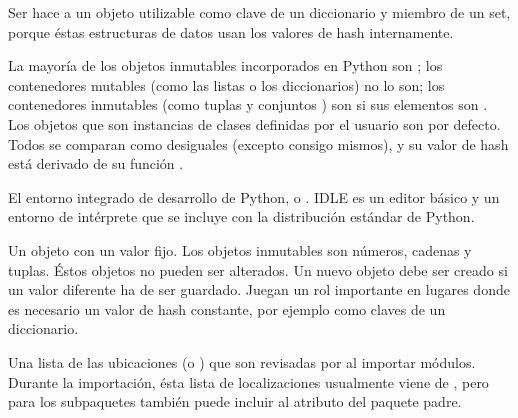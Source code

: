 \documentclass[a4,10pt,spanish]{sphinxmanual}
\begin{document}
\begin{description}
\sphinxAtStartPar
Ser  hace a un objeto utilizable como clave de un diccionario y miembro de un set, porque éstas estructuras de datos usan los valores de hash internamente.

\sphinxAtStartPar
La mayoría de los objetos inmutables incorporados en Python son ; los contenedores mutables (como las listas o los diccionarios) no lo son; los contenedores inmutables (como tuplas y conjuntos ) son  si sus elementos son  .  Los objetos que son instancias de clases definidas por el usuario son  por defecto.  Todos se comparan como desiguales (excepto consigo mismos), y su valor de hash está derivado de su función .

\item[{IDLE\index{IDLE@\spxentry{IDLE}|spxpagem}\phantomsection\label{\detokenize{glossary:term-IDLE}}}] \leavevmode
\sphinxAtStartPar
El entorno integrado de desarrollo de Python, o .  IDLE es un editor básico y un entorno de intérprete que se incluye con la distribución estándar de Python.

\item[{inmutable\index{inmutable@\spxentry{inmutable}|spxpagem}\phantomsection\label{\detokenize{glossary:term-immutable}}}] \leavevmode
\sphinxAtStartPar
Un objeto con un valor fijo.  Los objetos inmutables son números, cadenas y tuplas.  Éstos objetos no pueden ser alterados.  Un nuevo objeto debe ser creado si un valor diferente ha de ser guardado.  Juegan un rol importante en lugares donde es necesario un valor de hash constante, por ejemplo como claves de un diccionario.

\item[{ruta de importación\index{ruta de importación@\spxentry{ruta de importación}|spxpagem}\phantomsection\label{\detokenize{glossary:term-import-path}}}] \leavevmode
\sphinxAtStartPar
Una lista de las ubicaciones (o {\hyperref[\detokenize{glossary:term-path-entry}]{}}) que son revisadas por {\hyperref[\detokenize{glossary:term-path-based-finder}]{}} al importar módulos. Durante la importación, ésta lista de localizaciones usualmente viene de , pero para los subpaquetes también puede incluir al atributo  del paquete padre.


\end{description}
\end{document}
